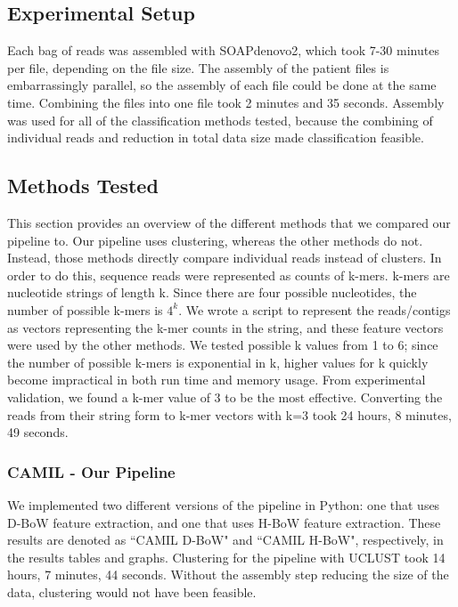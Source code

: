 
\subsection{Experimental Setup}

Each bag of reads was assembled with SOAPdenovo2, which took 7-30 minutes per file, depending on the file size. The assembly of the patient files is embarrassingly parallel, so the assembly of each file could be done at the same time. Combining the files into one file took 2 minutes and 35 seconds. Assembly was used for all of the classification methods tested, because the combining of individual reads and reduction in total data size made classification feasible.

\subsection{Methods Tested}

This section provides an overview of the different methods that we compared our pipeline to. Our pipeline uses clustering, whereas the other methods do not. Instead, those methods directly compare individual reads instead of clusters. In order to do this, sequence reads were represented as counts of k-mers. k-mers are nucleotide strings of 
length k. Since there are four possible nucleotides, the number of possible k-mers is \(4^k\). 
We wrote a script to represent the reads/contigs as vectors representing the k-mer counts in the string, and these feature 
vectors were used by the other methods. We tested possible k values 
from 1 to 6; since the number of possible k-mers is 
exponential in k, higher values for k quickly become impractical in both run time and memory usage. From experimental validation, we found a k-mer value of 3 to be the most effective. Converting the reads from their string form to k-mer vectors with k=3 took 24 hours, 8 minutes, 49 seconds.


\subsubsection{CAMIL - Our Pipeline}

We implemented two different versions of the pipeline in Python: one that uses D-BoW feature extraction, and one that uses H-BoW feature extraction. These results are denoted as ``CAMIL D-BoW" and ``CAMIL H-BoW", respectively, in the results tables and graphs. Clustering for the pipeline with UCLUST took 14 hours, 7 minutes, 44 seconds. Without the assembly step reducing the size of the data, clustering would not have been feasible.

